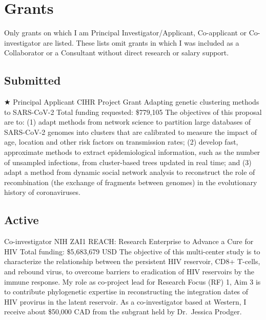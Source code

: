 
\section{Grants}

Only grants on which I am Principal Investigator/Applicant, Co-applicant or Co-investigator are listed.
These lists omit grants in which I was included as a Collaborator or a Consultant without direct research or salary support.


\subsection {Submitted}

{$\bigstar$ Principal Applicant}
{CIHR Project Grant}
{Adapting genetic clustering methods to SARS-CoV-2}
{Total funding requested: \$779,105}
{
The objectives of this proposal are to: (1) adapt methods from network science to partition large databases of SARS-CoV-2 genomes into clusters that are calibrated to measure the impact of age, location and other risk factors on transmission rates; (2) develop fast, approximate methods to extract epidemiological information, such as the number of unsampled infections, from cluster-based trees updated in real time; and (3) adapt a method from dynamic social network analysis to reconstruct the role of recombination (the exchange of fragments between genomes) in the evolutionary history of coronaviruses.\\
}



\subsection {Active}


{Co-investigator}
{NIH ZAI1}  %
{REACH: Research Enterprise to Advance a Cure for HIV}
{Total funding: \$5,683,679 USD}
{
The objective of this multi-center study is to characterize the relationship between the persistent HIV reservoir, CD8+ T-cells, and rebound virus, to overcome barriers to eradication of HIV reservoirs by the immune response. 
My role as co-project lead for Research Focus (RF) 1, Aim 3 is to contribute phylogenetic expertise in reconstructing the integration dates of HIV provirus in the latent reservoir. 
As a co-investigator based at Western, I receive about \$50,000 CAD from the subgrant held by Dr.~Jessica Prodger.
}


